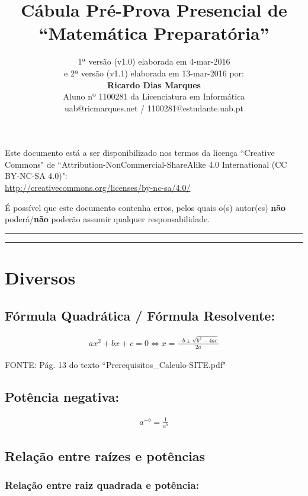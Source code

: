 \documentclass[portuguese,a4paper,12pt,onecolumn,fleqn]{article}
\title{Cábula Pré-Prova Presencial de \\``Matemática Preparatória''}
\author{1ª versão (v1.0) elaborada em 4-mar-2016 \\e 2ª versão (v1.1) elaborada em 13-mar-2016 por:
\\\textbf{Ricardo Dias Marques}\\
Aluno nº 1100281 da Licenciatura em Informática\\
uab@ricmarques.net / 1100281@estudante.uab.pt}
\newcommand{\myline}{\par
  \kern3pt %
  \hrule height 1.5pt
  \kern2pt %
  \hrule height 0.8pt
  \kern3pt %
}
\begin{document}
\maketitle

Este documento está a ser disponibilizado nos termos da licença ``Creative Commons" de 
``Attribution-NonCommercial-ShareAlike 4.0 International (CC BY-NC-SA 4.0)":\\
\url{http://creativecommons.org/licenses/by-nc-sa/4.0/}

É possível que este documento contenha erros, pelos quais o(s) autor(es) \textbf{não} poderá/\textbf{não} poderão assumir qualquer responsabilidade.


\myline	%


\section*{Diversos}

\subsection*{Fórmula Quadrática / Fórmula Resolvente:}


\begin{gather*}
ax^2 + bx + c = 0 
\Leftrightarrow x = \frac{-b \pm \sqrt{b^2 - 4ac}}{2a}
\end{gather*}

FONTE: Pág. 13 do texto ``Prerequisitos\_Calculo-SITE.pdf"


\subsection*{Potência negativa:}

\begin{gather*}
a^{-b} = \frac{1}{a^b}
\end{gather*}

\subsection*{Relação entre raízes e potências}

\subsubsection*{Relação entre raiz quadrada e potência:}
\end{document}
